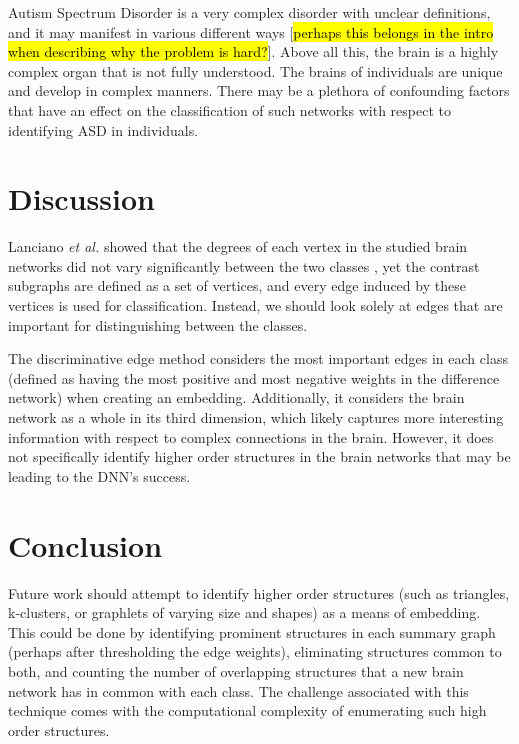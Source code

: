 \documentclass[sigconf]{acmart}
\begin{document}
Autism Spectrum Disorder is a very complex disorder with unclear definitions, and it may manifest in various different ways [\hl{perhaps this belongs in the intro when describing why the problem is hard?}].
Above all this, the brain is a highly complex organ that is not fully understood.
The brains of individuals are unique and develop in complex manners.
There may be a plethora of confounding factors that have an effect on the classification of such networks with respect to identifying ASD in individuals.

\section{Discussion} \label{discussion}

Lanciano \emph{et al.} showed that the degrees of each vertex in the studied brain networks did not vary significantly between the two classes \cite{lanciano2020},
yet the contrast subgraphs are defined as a set of vertices, and every edge induced by these vertices is used for classification.
Instead, we should look solely at edges that are important for distinguishing between the classes.

The discriminative edge method considers the most important edges in each class (defined as having the most positive and most negative weights in the difference network) when creating an embedding.
Additionally, it considers the brain network as a whole in its third dimension, which likely captures more interesting information with respect to complex connections in the brain.
However, it does not specifically identify higher order structures in the brain networks that may be leading to the DNN's success.

\section{Conclusion} \label{conclusion}

Future work should attempt to identify higher order structures (such as triangles, k-clusters, or graphlets of varying size and shapes) as a means of embedding.
This could be done by identifying prominent structures in each summary graph (perhaps after thresholding the edge weights), eliminating structures common to both, and counting the number of overlapping structures that a new brain network has in common with each class.
The challenge associated with this technique comes with the computational complexity of enumerating such high order structures.
\end{document}
